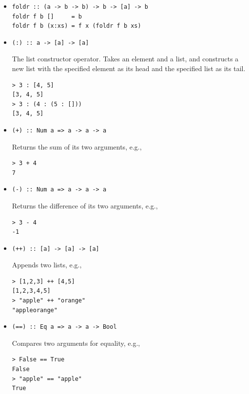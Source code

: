 \documentclass[addpoints]{exam}
\begin{document}
\begin{itemize}

\item
\begin{verbatim}
foldr :: (a -> b -> b) -> b -> [a] -> b
foldr f b []     = b
foldr f b (x:xs) = f x (foldr f b xs)
\end{verbatim}

\item
\begin{verbatim}
(:) :: a -> [a] -> [a]
\end{verbatim}
The list constructor operator.  Takes an element and a list, and constructs a new list with the specified element as its head and the specified list as its tail.
\begin{verbatim}
> 3 : [4, 5]
[3, 4, 5]
> 3 : (4 : (5 : []))
[3, 4, 5]
\end{verbatim}

\item
\begin{verbatim}
(+) :: Num a => a -> a -> a
\end{verbatim}
Returns the sum of its two arguments, e.g.,
\begin{verbatim}
> 3 + 4
7
\end{verbatim}

\item
\begin{verbatim}
(-) :: Num a => a -> a -> a
\end{verbatim}
Returns the difference of its two arguments, e.g.,
\begin{verbatim}
> 3 - 4
-1
\end{verbatim}

\item
\begin{verbatim}
(++) :: [a] -> [a] -> [a]
\end{verbatim}
Appends two lists, e.g.,
\begin{verbatim}
> [1,2,3] ++ [4,5]
[1,2,3,4,5]
> "apple" ++ "orange"
"appleorange"
\end{verbatim}

\item
\begin{verbatim}
(==) :: Eq a => a -> a -> Bool
\end{verbatim}
Compares two arguments for equality, e.g., 
\begin{verbatim}
> False == True
False
> "apple" == "apple"
True
\end{verbatim}

\end{itemize}
\end{document}
